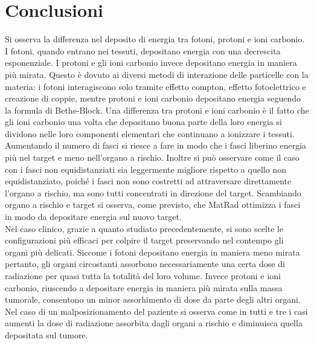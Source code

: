 \documentclass[a4paper,12pt]{article}
\begin{document}
    \section{Conclusioni}
        Si osserva la differenza nel deposito di energia tra fotoni, protoni e ioni carbonio. 
        I fotoni, quando entrano nei tessuti, depositano energia con una decrescita esponenziale.
        I protoni e gli ioni carbonio invece depositano energia in maniera più mirata.
        Questo è dovuto ai diversi metodi di interazione delle particelle con la materia: i fotoni interagiscono solo tramite effetto compton, effetto fotoelettrico e creazione di coppie, mentre protoni e ioni carbonio depositano energia seguendo la formula di Bethe-Block.
        Una differenza tra protoni e ioni carbonio è il fatto che gli ioni carbonio una volta che depositano buona parte della loro energia si dividono nelle loro componenti elementari che continuano a ionizzare i tessuti.
        Aumentando il numero di fasci si riesce a fare in modo che i fasci liberino energia più nel target e meno nell'organo a rischio.
        Inoltre si può osservare come il caso con i fasci non equidistanziati sia leggermente migliore rispetto a quello non equidistanziato, poiché i fasci non sono costretti ad attraversare direttamente l'organo a rischio, ma sono tutti concentrati in direzione del target.
        Scambiando organo a rischio e target si osserva, come previsto, che MatRad ottimizza i fasci in modo da depositare energia sul nuovo target.
        \\
        Nel caso clinico, grazie a quanto studiato precedentemente, si sono scelte le configurazioni più efficaci per colpire il target preservando nel contempo gli organi più delicati.
        Siccome i fotoni depositano energia in maniera meno mirata pertanto, gli organi circostanti assorbono necessariamente una certa dose di radiazione per quasi tutta la totalità del loro volume.
        Invece protoni e ioni carbonio, riuscendo a depositare energia in maniera più mirata sulla massa tumorale, consentono un minor assorhimento di dose da parte degli altri organi.
        Nel caso di un malposizionamento del paziente si osserva come in tutti e tre i casi aumenti la dose di radiazione assorbita dagli organi a rischio e diminuisca quella depositata sul tumore.
\end{document}
